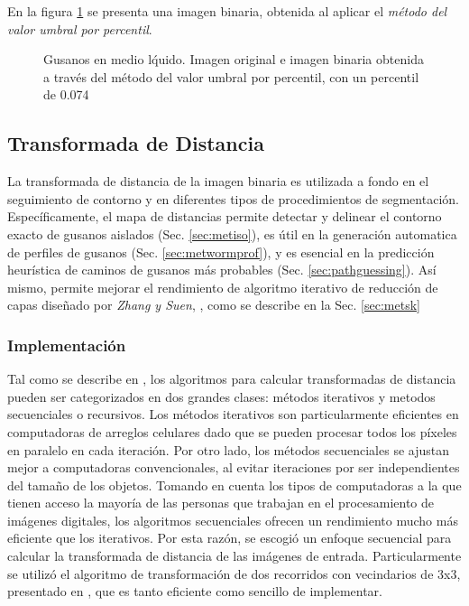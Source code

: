 En la figura \ref{fig:wormthres} se presenta una imagen binaria, obtenida al
aplicar el \emph{m\'etodo del valor umbral por percentil}.

\begin{figure}[h t b p ! H]
  \centering
\qquad
\caption{Gusanos en medio l\'quido. Imagen original e imagen binaria obtenida a trav\'es
del m\'etodo del valor umbral por percentil, con un percentil de 0.074}
  \label{fig:wormthres}
\end{figure}

\subsection{Transformada de Distancia}
\label{sec:metdt}

La transformada de distancia de la imagen binaria es utilizada a fondo en el
seguimiento de contorno y en diferentes tipos de procedimientos de segmentaci\'on.
Espec\'ificamente, el mapa de distancias permite detectar y delinear el contorno
exacto de gusanos aislados (Sec. \ref{sec:metiso}), es \'util en la generaci\'on
automatica de perfiles de gusanos (Sec. \ref{sec:metwormprof}), y es esencial en 
la predicci\'on heur\'istica de caminos de gusanos m\'as probables (Sec. \ref{sec:pathguessing}). 
As\'i mismo, permite mejorar el rendimiento de algoritmo iterativo de reducci\'on de capas
dise\~nado por \emph{Zhang y Suen}, \cite{thinning}, como se describe en 
la Sec. \ref{sec:metsk}

\subsubsection*{Implementaci\'on}
\label{sec:dtimp}

Tal como se describe en \cite[p.196]{fastdt}, los algoritmos para calcular transformadas de distancia pueden ser
categorizados en dos grandes clases: m\'etodos iterativos y metodos secuenciales o recursivos. 
Los m\'etodos iterativos son particularmente eficientes en computadoras de arreglos celulares
dado que se pueden procesar todos los p\'ixeles en paralelo en cada iteraci\'on. Por otro lado, los m\'etodos secuenciales
se ajustan mejor a computadoras convencionales, al evitar iteraciones por ser independientes del tama\~no de los objetos.
Tomando en cuenta los tipos de computadoras a la que tienen acceso la mayor\'ia de las personas que trabajan
en el procesamiento de im\'agenes digitales, los algoritmos secuenciales ofrecen un rendimiento mucho m\'as
eficiente que los iterativos. Por esta raz\'on, se escogi\'o un enfoque secuencial para calcular la 
transformada de distancia de las im\'agenes de entrada. Particularmente se utiliz\'o el algoritmo de
transformaci\'on de dos recorridos con vecindarios de 3x3, presentado en \cite{fastdt}, que es
tanto eficiente como sencillo de implementar.\\

